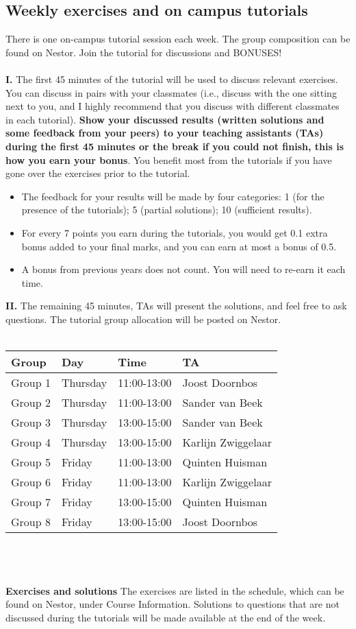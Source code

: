 \documentclass[openany]{article}
\begin{document}
\subsection{Weekly exercises and on campus tutorials}
There is one on-campus tutorial session each week. The group composition can be found on Nestor. Join the tutorial for discussions and BONUSES!\\~\\
\textbf{I.} {The first 45 minutes} of the tutorial will be used to discuss
relevant exercises. You can discuss in pairs with your classmates (i.e., discuss with the one sitting next to you, and I highly recommend that you discuss with different classmates in each tutorial). \textbf{Show your discussed results (written solutions and some feedback from your peers) to your teaching assistants (TAs) during the first 45 minutes or the break if you could not finish, this is how you earn your bonus}.  You benefit most from the tutorials if you have gone over the exercises prior to the tutorial.
\begin{itemize}
	\item The feedback for your results will be made by four categories: 1 (for the presence of the tutorials); 5 (partial solutions); 10 (sufficient results). 
	\item For every 7 points you earn during the tutorials, you would get 0.1 extra bonus added to your final marks, and you can earn at most a bonus of 0.5. 
	\item A bonus from previous years does not count. You will need to re-earn it each time. 
\end{itemize}
\textbf{II.} {The remaining 45 minutes,} TAs will present the solutions, and feel free to ask questions. The tutorial group allocation will be posted on Nestor.\\~\\
\begin{tabular}{llll} 
	Group & Day & Time & TA \\
	\hline Group 1 & Thursday & 11:00-13:00 & Joost Doornbos\\
	Group 2 & Thursday & 11:00-13:00 & Sander van Beek\\ 
	
	Group 3 & Thursday & 13:00-15:00 & Sander van Beek\\
	Group 4 & Thursday & 13:00-15:00 & Karlijn Zwiggelaar\\
	Group 5 & Friday & 11:00-13:00 & Quinten Huisman\\
	
	Group 6 & Friday & 11:00-13:00 & Karlijn Zwiggelaar \\
	Group 7 & Friday & 13:00-15:00 & Quinten Huisman\\
	Group 8 & Friday & 13:00-15:00 & Joost Doornbos\\
\end{tabular}~\\~\\~\\
\textbf{Exercises and solutions} The exercises are listed in the schedule, which
can be found on Nestor, under Course Information. Solutions to questions
that are not discussed during the tutorials will be made available at the end
of the week.
\end{document}
